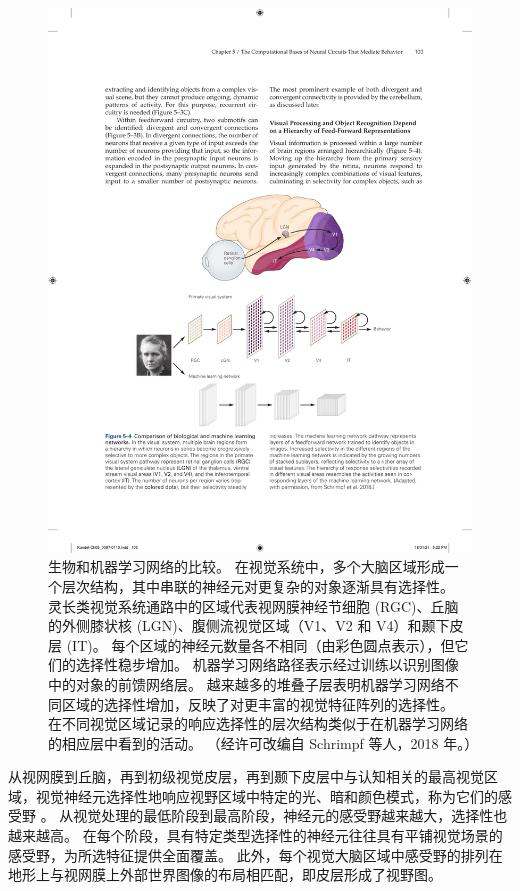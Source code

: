 \begin{figure}[htbp]
	\centering
	\includegraphics[width=1.0\linewidth]{chap05/fig_5_4}
	\caption{生物和机器学习网络的比较。 
		在视觉系统中，多个大脑区域形成一个层次结构，其中串联的神经元对更复杂的对象逐渐具有选择性。 
		灵长类视觉系统通路中的区域代表视网膜神经节细胞 (RGC)、丘脑的外侧膝状核 (LGN)、腹侧流视觉区域（V1、V2 和 V4）和颞下皮层 (IT)。
		每个区域的神经元数量各不相同（由彩色圆点表示），但它们的选择性稳步增加。 
		机器学习网络路径表示经过训练以识别图像中的对象的前馈网络层。 
		越来越多的堆叠子层表明机器学习网络不同区域的选择性增加，反映了对更丰富的视觉特征阵列的选择性。 在不同视觉区域记录的响应选择性的层次结构类似于在机器学习网络的相应层中看到的活动。 （经许可改编自 Schrimpf 等人，2018 年。）}
	\label{fig:5_4}
\end{figure}



从视网膜到丘脑，再到初级视觉皮层，再到颞下皮层中与认知相关的最高视觉区域，视觉神经元选择性地响应视野区域中特定的光、暗和颜色模式，称为它们的感受野 。
从视觉处理的最低阶段到最高阶段，神经元的感受野越来越大，选择性也越来越高。
在每个阶段，具有特定类型选择性的神经元往往具有平铺视觉场景的感受野，为所选特征提供全面覆盖。
此外，每个视觉大脑区域中感受野的排列在地形上与视网膜上外部世界图像的布局相匹配，即皮层形成了视野图。


